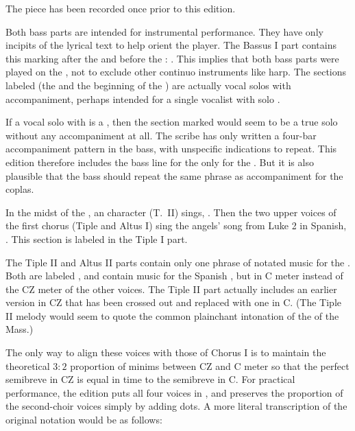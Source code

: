 The piece has been recorded once prior to this edition.%
  \autocite{Padilla:1652ChristmasCD}


Both bass parts are intended for instrumental performance.
They have only incipits of the lyrical text to help orient the player.
The Bassus I part contains this marking after the  and before the : .
This implies that both bass parts were played on the , not to exclude other continuo instruments like harp.
The sections labeled  (the  and the beginning of the ) are actually vocal solos with accompaniment, perhaps intended for a single vocalist with solo .

If a vocal solo with  is a , then the section marked  would seem to be a true solo without any accompaniment at all.
The scribe has only written a four-bar accompaniment pattern in the bass, with unspecific indications to repeat.
This edition therefore includes the bass line for the  only for the .
But it is also plausible that the bass should repeat the same phrase as accompaniment for the coplas.


In the midst of the , an  character (T.~II) sings, .
Then the two upper voices of the first chorus (Tiple and Altus I) sing the angels' song from Luke 2 in Spanish, .
This section is labeled  in the Tiple I part.

The Tiple II and Altus II parts contain only one phrase of notated music for the .
Both are labeled , and contain music for the Spanish , but in C meter instead of the CZ meter of the other voices.
The Tiple II part actually includes an earlier version in CZ that has been crossed out and replaced with one in C.
(The Tiple II melody would seem to quote the common plainchant intonation of the  of the Mass.)

The only way to align these voices with those of Chorus I is to maintain the theoretical $3:2$ proportion of minims between CZ and C meter so that the perfect semibreve in CZ is equal in time to the semibreve in C.
For practical performance, the edition puts all four voices in , and preserves the proportion of the second-choir voices simply by adding dots.
A more literal transcription of the original notation would be as follows:

